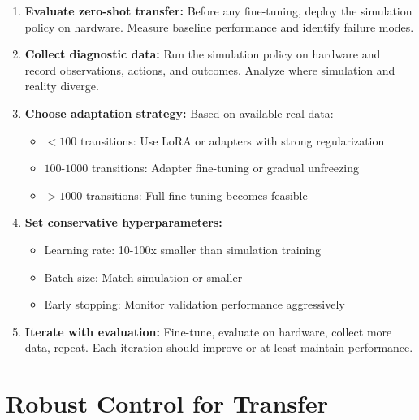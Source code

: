 \begin{enumerate}
    \item \textbf{Evaluate zero-shot transfer:} Before any fine-tuning, deploy the simulation policy on hardware. Measure baseline performance and identify failure modes.

    \item \textbf{Collect diagnostic data:} Run the simulation policy on hardware and record observations, actions, and outcomes. Analyze where simulation and reality diverge.

    \item \textbf{Choose adaptation strategy:} Based on available real data:
    \begin{itemize}
        \item $< 100$ transitions: Use LoRA or adapters with strong regularization
        \item $100$-$1000$ transitions: Adapter fine-tuning or gradual unfreezing
        \item $> 1000$ transitions: Full fine-tuning becomes feasible
    \end{itemize}

    \item \textbf{Set conservative hyperparameters:}
    \begin{itemize}
        \item Learning rate: 10-100x smaller than simulation training
        \item Batch size: Match simulation or smaller
        \item Early stopping: Monitor validation performance aggressively
    \end{itemize}

    \item \textbf{Iterate with evaluation:} Fine-tune, evaluate on hardware, collect more data, repeat. Each iteration should improve or at least maintain performance.
\end{enumerate}


\section{Robust Control for Transfer}
\label{sec:robust_control_transfer}

